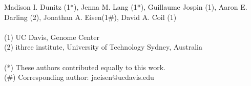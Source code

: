 Madison I. Dunitz (1*), Jenna M. Lang (1*), Guillaume Jospin (1), Aaron E. Darling (2), Jonathan A. Eisen(1#), David A. Coil (1) \\
\\
(1) UC Davis, Genome Center \\
(2) ithree institute, University of Technology Sydney, Australia\\
\\
(*) These authors contributed equally to this work. \\ 
(#) Corresponding author: jaeisen@ucdavis.edu